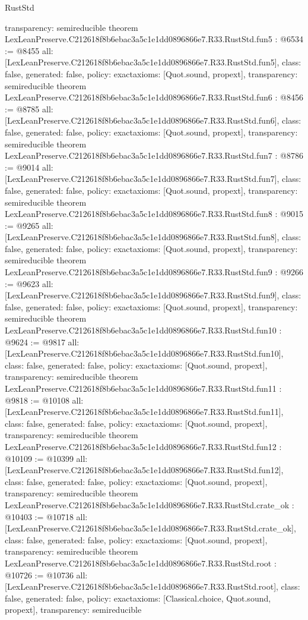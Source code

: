 \begin{lexlean}{RustStd}
\begin{coremodule}
{  transparency: semireducible
}
theorem LexLeanPreserve.C212618f8b6ebac3a5c1e1dd0896866e7.R33.RustStd.fun5 : @6534 := @8455 {
  all: [LexLeanPreserve.C212618f8b6ebac3a5c1e1dd0896866e7.R33.RustStd.fun5],
  class: false,
  generated: false,
  policy: exact{axioms: [Quot.sound, propext]},
  transparency: semireducible
}
theorem LexLeanPreserve.C212618f8b6ebac3a5c1e1dd0896866e7.R33.RustStd.fun6 : @8456 := @8785 {
  all: [LexLeanPreserve.C212618f8b6ebac3a5c1e1dd0896866e7.R33.RustStd.fun6],
  class: false,
  generated: false,
  policy: exact{axioms: [Quot.sound, propext]},
  transparency: semireducible
}
theorem LexLeanPreserve.C212618f8b6ebac3a5c1e1dd0896866e7.R33.RustStd.fun7 : @8786 := @9014 {
  all: [LexLeanPreserve.C212618f8b6ebac3a5c1e1dd0896866e7.R33.RustStd.fun7],
  class: false,
  generated: false,
  policy: exact{axioms: [Quot.sound, propext]},
  transparency: semireducible
}
theorem LexLeanPreserve.C212618f8b6ebac3a5c1e1dd0896866e7.R33.RustStd.fun8 : @9015 := @9265 {
  all: [LexLeanPreserve.C212618f8b6ebac3a5c1e1dd0896866e7.R33.RustStd.fun8],
  class: false,
  generated: false,
  policy: exact{axioms: [Quot.sound, propext]},
  transparency: semireducible
}
theorem LexLeanPreserve.C212618f8b6ebac3a5c1e1dd0896866e7.R33.RustStd.fun9 : @9266 := @9623 {
  all: [LexLeanPreserve.C212618f8b6ebac3a5c1e1dd0896866e7.R33.RustStd.fun9],
  class: false,
  generated: false,
  policy: exact{axioms: [Quot.sound, propext]},
  transparency: semireducible
}
theorem LexLeanPreserve.C212618f8b6ebac3a5c1e1dd0896866e7.R33.RustStd.fun10 : @9624 := @9817 {
  all: [LexLeanPreserve.C212618f8b6ebac3a5c1e1dd0896866e7.R33.RustStd.fun10],
  class: false,
  generated: false,
  policy: exact{axioms: [Quot.sound, propext]},
  transparency: semireducible
}
theorem LexLeanPreserve.C212618f8b6ebac3a5c1e1dd0896866e7.R33.RustStd.fun11 : @9818 := @10108 {
  all: [LexLeanPreserve.C212618f8b6ebac3a5c1e1dd0896866e7.R33.RustStd.fun11],
  class: false,
  generated: false,
  policy: exact{axioms: [Quot.sound, propext]},
  transparency: semireducible
}
theorem LexLeanPreserve.C212618f8b6ebac3a5c1e1dd0896866e7.R33.RustStd.fun12 : @10109 := @10399 {
  all: [LexLeanPreserve.C212618f8b6ebac3a5c1e1dd0896866e7.R33.RustStd.fun12],
  class: false,
  generated: false,
  policy: exact{axioms: [Quot.sound, propext]},
  transparency: semireducible
}
theorem LexLeanPreserve.C212618f8b6ebac3a5c1e1dd0896866e7.R33.RustStd.crate_ok : @10403 := @10718 {
  all: [LexLeanPreserve.C212618f8b6ebac3a5c1e1dd0896866e7.R33.RustStd.crate_ok],
  class: false,
  generated: false,
  policy: exact{axioms: [Quot.sound, propext]},
  transparency: semireducible
}
theorem LexLeanPreserve.C212618f8b6ebac3a5c1e1dd0896866e7.R33.RustStd.root : @10726 := @10736 {
  all: [LexLeanPreserve.C212618f8b6ebac3a5c1e1dd0896866e7.R33.RustStd.root],
  class: false,
  generated: false,
  policy: exact{axioms: [Classical.choice, Quot.sound, propext]},
  transparency: semireducible
}


\end{coremodule}
\end{lexlean}
